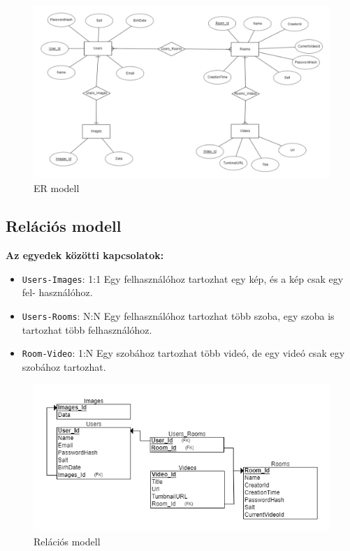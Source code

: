 \begin{figure}[H]
    \centering
    \includegraphics[width=15.0truecm]{images/er_modell.png}
    \caption{ER modell}
    \label{fig:er_modell}
\end{figure}

\subsection{Relációs modell}
\textbf{Az egyedek közötti kapcsolatok:}
\begin{itemize}
    \item \texttt{Users-Images}: 1:1 Egy felhasználóhoz tartozhat egy kép, és a kép csak egy fel-
          használóhoz.
    \item \texttt{Users-Rooms}: N:N Egy felhasználóhoz tartozhat több szoba, egy szoba is tartozhat
          több felhasználóhoz.
    \item \texttt{Room-Video}: 1:N Egy szobához tartozhat több videó, de egy videó csak egy
          szobához tartozhat.
\end{itemize}

\begin{figure}[H]
    \centering
    \includegraphics[width=15.0truecm]{images/relation_modell.png}
    \caption{Relációs modell}
    \label{fig:relation_modell}
\end{figure}

